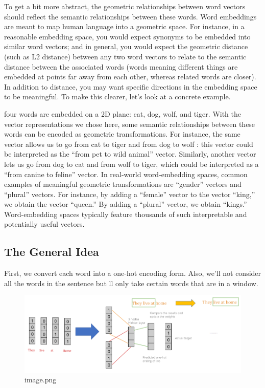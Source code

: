 \documentclass[11pt]{article}
\begin{document}
To get a bit more abstract, the geometric relationships between word
vectors should reflect the semantic relationships between these words.
Word embeddings are meant to map human language into a geometric space.
For instance, in a reasonable embedding space, you would expect synonyms
to be embedded into similar word vectors; and in general, you would
expect the geometric distance (such as L2 distance) between any two word
vectors to relate to the semantic distance between the associated words
(words meaning different things are embedded at points far away from
each other, whereas related words are closer). In addition to distance,
you may want specific directions in the embedding space to be
meaningful. To make this clearer, let's look at a concrete example.

    four words are embedded on a 2D plane: cat, dog, wolf, and tiger. With
the vector representations we chose here, some semantic relationships
between these words can be encoded as geometric transformations. For
instance, the same vector allows us to go from cat to tiger and from dog
to wolf : this vector could be interpreted as the ``from pet to wild
animal'' vector. Similarly, another vector lets us go from dog to cat
and from wolf to tiger, which could be interpreted as a ``from canine to
feline'' vector. In real-world word-embedding spaces, common examples of
meaningful geometric transformations are ``gender'' vectors and
``plural'' vectors. For instance, by adding a ``female'' vector to the
vector ``king,'' we obtain the vector ``queen.'' By adding a ``plural''
vector, we obtain ``kings.'' Word-embedding spaces typically feature
thousands of such interpretable and potentially useful vectors.

    \hypertarget{the-general-idea}{%
\subsection{The General Idea}\label{the-general-idea}}

    First, we convert each word into a one-hot encoding form. Also, we'll
not consider all the words in the sentence but ll only take certain
words that are in a window.

    \begin{figure}
\centering
\includegraphics{./img/word-embedding-1.png}
\caption{image.png}
\end{figure}
\end{document}
